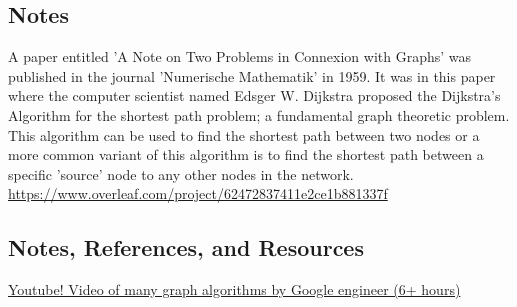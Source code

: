 \fi


\subsection{Notes}

A paper entitled 'A Note on Two Problems in Connexion with Graphs' was published in the journal 'Numerische Mathematik' in 1959. It was in this paper where the computer scientist named Edsger W. Dijkstra proposed the Dijkstra's Algorithm for the shortest path problem; a fundamental graph theoretic problem. This algorithm can be used to find the shortest path between two nodes or a more common variant of this algorithm is to find the shortest path between a specific 'source' node to any other nodes in the network. \href{Thanks Jerrin baby}{https://www.overleaf.com/project/62472837411e2ce1b881337f}

\subsection*{Notes, References, and Resources}
\begin{resource}
\href{https://www.youtube.com/watch?v=09_LlHjoEiY}{Youtube!  Video of many graph algorithms by Google engineer (6+ hours)}
\end{resource}
